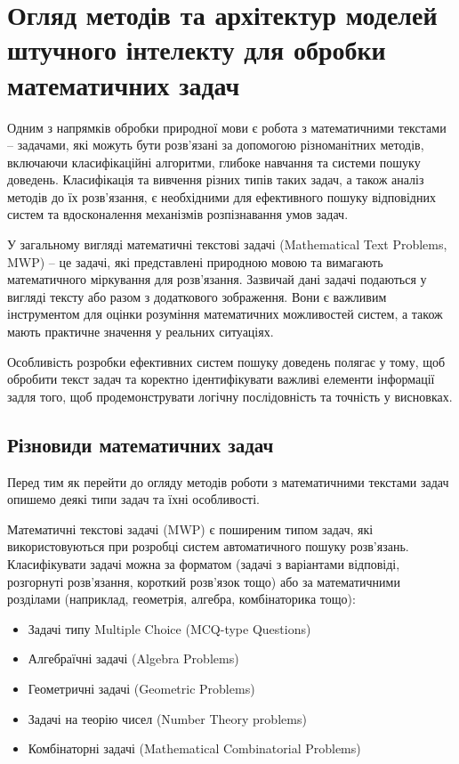 \chapter{Огляд методів та архітектур моделей штучного інтелекту для обробки математичних задач}

Одним з напрямків обробки природної мови є робота з математичними текстами – задачами, які можуть бути розв'язані за допомогою різноманітних методів, включаючи класифікаційні алгоритми, глибоке навчання та системи пошуку доведень. Класифікація та вивчення різних типів таких задач, а також аналіз методів до їх розв'язання, є необхідними для ефективного пошуку відповідних систем та вдосконалення механізмів розпізнавання умов задач.

У загальному вигляді математичні текстові задачі (Mathematical Text Problems, MWP) -- це задачі, які представлені природною мовою та вимагають математичного міркування для розв'язання. Зазвичай дані задачі подаються у вигляді тексту або разом з додаткового зображення. Вони є важливим інструментом для оцінки розуміння математичних можливостей систем, а також мають практичне значення у реальних ситуаціях.

Особливість розробки ефективних систем пошуку доведень полягає у тому, щоб обробити текст задач та коректно ідентифікувати важливі елементи інформації задля того, щоб продемонструвати логічну послідовність та точність у висновках.

\section{Різновиди математичних задач}

Перед тим як перейти до огляду методів роботи з математичними текстами задач опишемо деякі типи задач та їхні особливості.

Математичні текстові задачі (MWP) є поширеним типом задач, які використовуються при розробці систем автоматичного пошуку розв'язань. Класифікувати задачі можна за форматом (задачі з варіантами відповіді, розгорнуті розв'язання, короткий розв'язок тощо) або за математичними розділами (наприклад, геометрія, алгебра, комбінаторика тощо):

\begin{itemize}
    \item Задачі типу Multiple Choice (MCQ-type Questions)
    \item Алгебраїчні задачі (Algebra Problems)
    \item Геометричні задачі (Geometric Problems)
    \item Задачі на теорію чисел (Number Theory problems)
    \item Комбінаторні задачі (Mathematical Combinatorial Problems)
\end{itemize}

